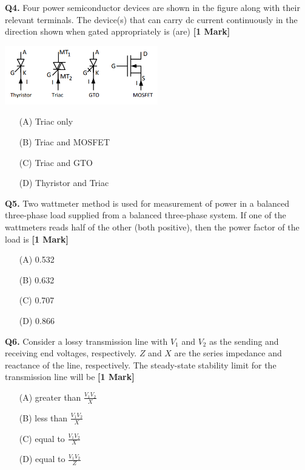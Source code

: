 \documentclass[11pt]{article}
\newcommand{\questiona}[2]{
    \noindent\textbf{Q#2.} #1 \hfill \textbf{[1 Mark]}
}
\begin{document}
\questiona{Four power semiconductor devices are shown in the figure along with their relevant terminals. The device(s) that can carry dc current continuously in the direction shown when gated appropriately is (are)}{4}
\begin{center}
\includegraphics[width=0.5\textwidth]{figures/4.png}
\end{center}
\begin{enumerate}
    \item[(A)] Triac only
    \item[(B)] Triac and MOSFET
    \item[(C)] Triac and GTO
    \item[(D)] Thyristor and Triac
\end{enumerate}
\vspace{0.5cm}

\questiona{Two wattmeter method is used for measurement of power in a balanced three-phase load supplied from a balanced three-phase system. If one of the wattmeters reads half of the other (both positive), then the power factor of the load is}{5}
\begin{enumerate}
    \item[(A)] 0.532
    \item[(B)] 0.632
    \item[(C)] 0.707
    \item[(D)] 0.866
\end{enumerate}
\vspace{0.5cm}

\questiona{Consider a lossy transmission line with \( V_1 \) and \( V_2 \) as the sending and receiving end voltages, respectively. \( Z \) and \( X \) are the series impedance and reactance of the line, respectively. The steady-state stability limit for the transmission line will be}{6}
\begin{enumerate}
    \item[(A)] greater than \( \frac{V_1 V_2}{X} \)
    \item[(B)] less than \( \frac{V_1 V_2}{X} \)
    \item[(C)] equal to \( \frac{V_1 V_2}{X} \)
    \item[(D)] equal to \( \frac{V_1 V_2}{Z} \)
\end{enumerate}
\vspace{0.5cm}
\end{document}

